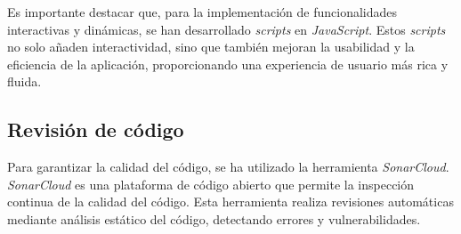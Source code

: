 Es importante destacar que, para la implementación de funcionalidades interactivas y dinámicas, se han desarrollado \textit{scripts} en \textit{JavaScript}. Estos \textit{scripts} no solo añaden interactividad, sino que también mejoran la usabilidad y la eficiencia de la aplicación, proporcionando una experiencia de usuario más rica y fluida.


\subsection{Revisión de código}
Para garantizar la calidad del código, se ha utilizado la herramienta \textit{SonarCloud}. \textit{SonarCloud} es una plataforma de código abierto que permite la inspección continua de la calidad del código. Esta herramienta realiza revisiones automáticas mediante análisis estático del código, detectando errores y vulnerabilidades.
